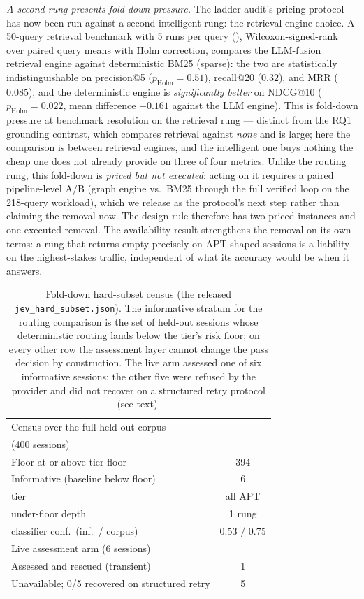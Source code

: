 \emph{A second rung presents fold-down pressure.} The ladder audit's
pricing protocol has now been run against a second intelligent rung: the
retrieval-engine choice. A 50-query retrieval benchmark with 5 runs per
query (), Wilcoxon-signed-rank over paired
query means with Holm correction, compares the LLM-fusion retrieval
engine against deterministic BM25 (sparse): the two are statistically
indistinguishable on precision@5 ($p_{\text{Holm}}{=}0.51$),
recall@20 ($0.32$), and MRR ($0.085$), and the deterministic engine is
\emph{significantly better} on NDCG@10 ($p_{\text{Holm}}{=}0.022$, mean
difference $-0.161$ against the LLM engine). This is fold-down pressure
at benchmark resolution on the retrieval rung --- distinct from the
RQ1 grounding contrast, which compares retrieval against \emph{none} and
is large; here the comparison is between retrieval engines, and the
intelligent one buys nothing the cheap one does not already provide on
three of four metrics. Unlike the routing rung, this fold-down is
\emph{priced but not executed}: acting on it requires a paired
pipeline-level A/B (graph engine vs.\ BM25 through the full verified
loop on the 218-query workload), which we release as the protocol's next
step rather than claiming the removal now. The design rule therefore has
two priced instances and one executed removal.
The availability result strengthens the removal on its own terms: a
rung that returns empty precisely on APT-shaped sessions is a liability
on the highest-stakes traffic, independent of what its accuracy would
be when it answers.

\begin{table}[t]
\centering
\caption{Fold-down hard-subset census (the released
\texttt{jev\_hard\_subset.json}). The informative stratum for the routing
comparison is the set of held-out sessions whose deterministic routing
lands below the tier's risk floor; on every other row the assessment
layer cannot change the pass decision by construction. The live arm
assessed one of six informative sessions; the other five were refused
by the provider and did not recover on a structured retry protocol
(see text).}
\label{tab:hardsunset}
\small
\setlength{\tabcolsep}{4pt}
\begin{tabular}{@{}lc@{}}
\toprule
Census over the full held-out corpus & \\
(400 sessions) & \\
\midrule
Floor at or above tier floor & 394 \\
Informative (baseline below floor) & 6 \\
\quad tier & all APT \\
\quad under-floor depth & 1 rung \\
\quad classifier conf.\ (inf.\ / corpus) & 0.53 / 0.75 \\
\midrule
Live assessment arm (6 sessions) & \\
\midrule
Assessed and rescued (transient) & 1 \\
Unavailable; 0/5 recovered on structured retry & 5 \\
\bottomrule
\end{tabular}
\end{table}

